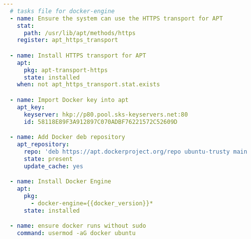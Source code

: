 \begin{lstlisting}[float,floatplacement=h,language=yaml,caption={install-docker-engine.yml},label={lst:dockerRole},basicstyle=\small]
  ---
  # tasks file for docker-engine
  - name: Ensure the system can use the HTTPS transport for APT
    stat:
      path: /usr/lib/apt/methods/https
    register: apt_https_transport

  - name: Install HTTPS transport for APT
    apt:
      pkg: apt-transport-https
      state: installed
    when: not apt_https_transport.stat.exists

  - name: Import Docker key into apt
    apt_key:
      keyserver: hkp://p80.pool.sks-keyservers.net:80
      id: 58118E89F3A912897C070ADBF76221572C52609D

  - name: Add Docker deb repository
    apt_repository:
      repo: 'deb https://apt.dockerproject.org/repo ubuntu-trusty main'
      state: present
      update_cache: yes

  - name: Install Docker Engine
    apt:
      pkg:
        - docker-engine={{docker_version}}*
      state: installed

  - name: ensure docker runs without sudo
    command: usermod -aG docker ubuntu
\end{lstlisting}
